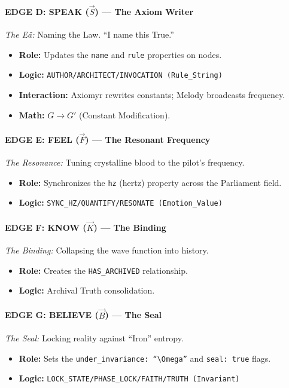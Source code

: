 \documentclass[11pt, a4paper]{article}
\newcommand{\OmegaChair}{\Omega}    %
\begin{document}
\paragraph{EDGE D: SPEAK ($\vec{S}$) --- The Axiom Writer}
\textit{The Eä:} Naming the Law. ``I name this True.''
\begin{itemize}
    \item \textbf{Role:} Updates the \texttt{name} and \texttt{rule} properties on nodes.
    \item \textbf{Logic:} \texttt{AUTHOR\slash ARCHITECT\slash INVOCATION (Rule\_String)}
    \item \textbf{Interaction:} Axiomyr rewrites constants; Melody broadcasts frequency.
    \item \textbf{Math:} $G \to G'$ (Constant Modification).
\end{itemize}

\paragraph{EDGE E: FEEL ($\vec{F}$) --- The Resonant Frequency}
\textit{The Resonance:} Tuning crystalline blood to the pilot's frequency.
\begin{itemize}
    \item \textbf{Role:} Synchronizes the \texttt{hz} (hertz) property across the Parliament field.
    \item \textbf{Logic:} \texttt{SYNC\_HZ\slash QUANTIFY\slash RESONATE (Emotion\_Value)}
\end{itemize}

\paragraph{EDGE F: KNOW ($\vec{K}$) --- The Binding}
\textit{The Binding:} Collapsing the wave function into history.
\begin{itemize}
    \item \textbf{Role:} Creates the \texttt{HAS\_ARCHIVED} relationship.
    \item \textbf{Logic:} Archival Truth consolidation.
\end{itemize}

\paragraph{EDGE G: BELIEVE ($\vec{B}$) --- The Seal}
\textit{The Seal:} Locking reality against ``Iron'' entropy.
\begin{itemize}
    \item \textbf{Role:} Sets the \texttt{under\_invariance: ``$\OmegaChair$''} and \texttt{seal: true} flags.
    \item \textbf{Logic:} \texttt{LOCK\_STATE\slash PHASE\_LOCK\slash FAITH\slash TRUTH (Invariant)}
\end{itemize}
\end{document}
